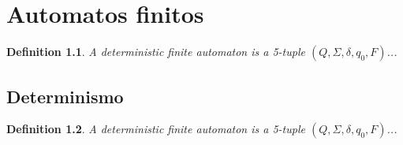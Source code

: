 \documentclass[10pt,twoside,openright]{memoir}
\theoremstyle{sipserstyle}
\newtheorem{definition}{Definition}[chapter]
\begin{document}
\chapter{Automatos finitos}

\lipsum[9-10]


\begin{definition}
A deterministic finite automaton is a 5-tuple $(Q,\Sigma,\delta,q_0,F)$...
\end{definition}



\section{Determinismo}
\lipsum[11-14]


\begin{definition}
A deterministic finite automaton is a 5-tuple $(Q,\Sigma,\delta,q_0,F)$...
\end{definition}



\lipsum[9-10]
\lipsum[4-6]
\end{document}
